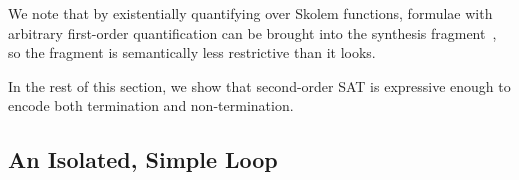 \documentclass[a4paper]{llncs}
\begin{document}


%
We note that by existentially quantifying over Skolem functions, formulae with arbitrary
first-order quantification can be brought into the synthesis fragment~\cite{hol-book}, so the
fragment is semantically less restrictive than it looks.

In the rest of this section, we show that second-order SAT 
is expressive enough to encode both termination and non-termination. 



\subsection{An Isolated, Simple Loop}
\end{document}

